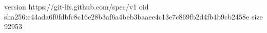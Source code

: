 version https://git-lfs.github.com/spec/v1
oid sha256:c44ada6f0fdbfc8c16e28b3af6a4beb3baaee4c13e7c869fb2d4fb4b9cb2458e
size 92953
